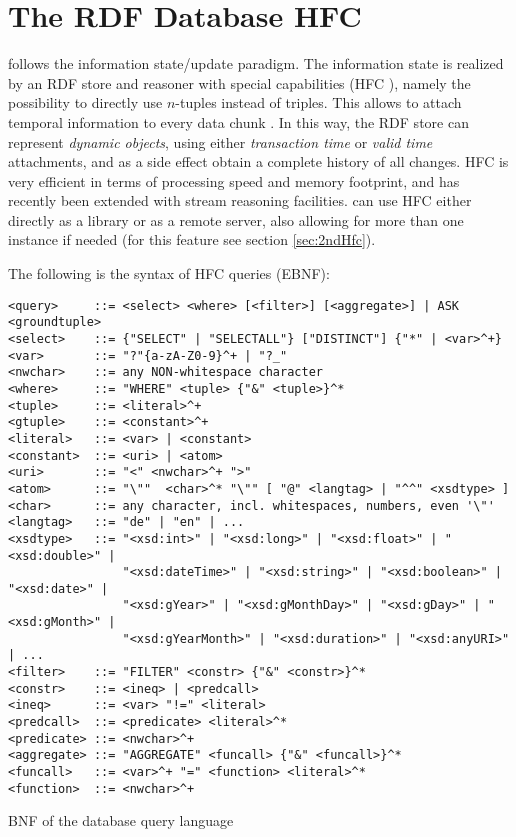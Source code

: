 \section{The RDF Database HFC} \label{sec:hfc}

\vonda follows the information state/update paradigm. The information state is
realized by an RDF store and reasoner with special capabilities
(HFC \cite{krieger2013efficient}), namely the
possibility to directly use $n$-tuples instead of triples. This allows to
attach temporal information to every data chunk \cite{Krieger:FOIS2012,
  krieger2014detailed}. In this way, the RDF store can represent \emph{dynamic
  objects}, using either \emph{transaction time} or \emph{valid time}
attachments, and as a side effect obtain a complete history of all changes.
HFC is very efficient in terms of processing speed and memory footprint, and
has recently been extended with stream reasoning facilities. \vonda can use HFC
either directly as a library or as a remote server, also allowing for more
than one instance if needed (for this feature see section \ref{sec:2ndHfc}).

The following is the syntax of HFC queries (EBNF):
\begin{table}[htbp]
  \centering\small
\begin{verbatim}
<query>     ::= <select> <where> [<filter>] [<aggregate>] | ASK <groundtuple>
<select>    ::= {"SELECT" | "SELECTALL"} ["DISTINCT"] {"*" | <var>^+}
<var>       ::= "?"{a-zA-Z0-9}^+ | "?_"
<nwchar>    ::= any NON-whitespace character
<where>     ::= "WHERE" <tuple> {"&" <tuple>}^*
<tuple>     ::= <literal>^+
<gtuple>    ::= <constant>^+
<literal>   ::= <var> | <constant>
<constant>  ::= <uri> | <atom>
<uri>       ::= "<" <nwchar>^+ ">"
<atom>      ::= "\""  <char>^* "\"" [ "@" <langtag> | "^^" <xsdtype> ]
<char>      ::= any character, incl. whitespaces, numbers, even '\"'
<langtag>   ::= "de" | "en" | ...
<xsdtype>   ::= "<xsd:int>" | "<xsd:long>" | "<xsd:float>" | "<xsd:double>" |
                "<xsd:dateTime>" | "<xsd:string>" | "<xsd:boolean>" | "<xsd:date>" |
                "<xsd:gYear>" | "<xsd:gMonthDay>" | "<xsd:gDay>" | "<xsd:gMonth>" |
                "<xsd:gYearMonth>" | "<xsd:duration>" | "<xsd:anyURI>" | ...
<filter>    ::= "FILTER" <constr> {"&" <constr>}^*
<constr>    ::= <ineq> | <predcall>
<ineq>      ::= <var> "!=" <literal>
<predcall>  ::= <predicate> <literal>^*
<predicate> ::= <nwchar>^+
<aggregate> ::= "AGGREGATE" <funcall> {"&" <funcall>}^*
<funcall>   ::= <var>^+ "=" <function> <literal>^*
<function>  ::= <nwchar>^+
\end{verbatim}
  \caption{BNF of the database query language}
  \label{tab:hfcquerybnf}
\end{table}

